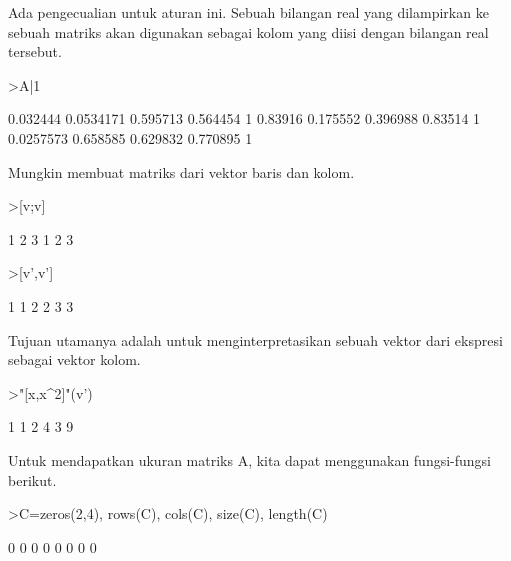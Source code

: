 \documentclass[a4paper,10pt]{article}
\begin{document}
\begin{eulernotebook}
\begin{eulercomment}
\begin{eulercomment}
\begin{eulercomment}
\begin{eulercomment}
\begin{eulercomment}
Ada pengecualian untuk aturan ini. Sebuah bilangan real yang
dilampirkan ke sebuah matriks akan digunakan sebagai kolom yang diisi
dengan bilangan real tersebut.
\end{eulercomment}
\begin{eulerprompt}
>A|1
\end{eulerprompt}
\begin{euleroutput}
       0.032444     0.0534171      0.595713      0.564454             1 
        0.83916      0.175552      0.396988       0.83514             1 
      0.0257573      0.658585      0.629832      0.770895             1 
\end{euleroutput}
\begin{eulercomment}
Mungkin membuat matriks dari vektor baris dan kolom.
\end{eulercomment}
\begin{eulerprompt}
>[v;v]
\end{eulerprompt}
\begin{euleroutput}
              1             2             3 
              1             2             3 
\end{euleroutput}
\begin{eulerprompt}
>[v',v']
\end{eulerprompt}
\begin{euleroutput}
              1             1 
              2             2 
              3             3 
\end{euleroutput}
\begin{eulercomment}
Tujuan utamanya adalah untuk menginterpretasikan sebuah vektor dari
ekspresi sebagai vektor kolom.
\end{eulercomment}
\begin{eulerprompt}
>"[x,x^2]"(v')
\end{eulerprompt}
\begin{euleroutput}
              1             1 
              2             4 
              3             9 
\end{euleroutput}
\begin{eulercomment}
Untuk mendapatkan ukuran matriks A, kita dapat menggunakan
fungsi-fungsi berikut.
\end{eulercomment}
\begin{eulerprompt}
>C=zeros(2,4), rows(C), cols(C), size(C), length(C)
\end{eulerprompt}
\begin{euleroutput}
              0             0             0             0 
              0             0             0             0 

\end{euleroutput}
\end{eulercomment}
\end{eulercomment}
\end{eulercomment}
\end{eulercomment}
\end{eulernotebook}
\end{document}
